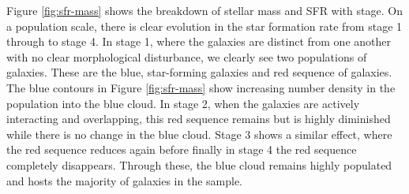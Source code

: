 Figure \ref{fig:sfr-mass} shows the breakdown of stellar mass and SFR with stage. On a population scale, there is clear evolution in the star formation rate from stage 1 through to stage 4. In stage 1, where the galaxies are distinct from one another with no clear morphological disturbance, we clearly see two populations of galaxies. These are the blue, star-forming galaxies and red sequence of galaxies. The blue contours in Figure \ref{fig:sfr-mass} show increasing number density in the population into the blue cloud. In stage 2, when the galaxies are actively interacting and overlapping, this red sequence remains but is highly diminished while there is no change in the blue cloud. Stage 3 shows a similar effect, where the red sequence reduces again before finally in stage 4 the red sequence completely disappears. Through these, the blue cloud remains highly populated and hosts the majority of galaxies in the sample.


